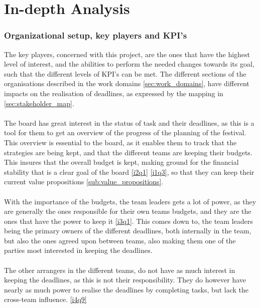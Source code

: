 \part{In-depth Analysis}
\label{prt:in_depth_analysis}
\section{Organizational setup, key players and KPI's}
The key players, concerned with this project, are the ones that have the highest level of interest, and the abilities to perform the needed changes towards its goal, such that the different levels of KPI's can be met. The different sections of the organisations described in the work domains \ref{sec:work_domains}, have different impacts on the realisation of deadlines, as expressed by the mapping in \ref{sec:stakeholder_map}.
\\ \\
The board has great interest in the status of task and their deadlines, as this is a tool for them to get an overview of the progress of the planning of the festival. This overview is essential to the board, as it enables them to track that the strategies are being kept, and that the different teams are keeping their budgets. This insures that the overall budget is kept, making ground for the financial stability that is a clear goal of the board \ref{i2q1} \ref{i1q3}, so that they can keep their current value propositions \ref{sub:value_propositions}.
\\ \\
With the importance of the budgets, the team leaders gets a lot of power, as they are generally the ones responsible for their own teams budgets, and they are the ones that have the power to keep it \ref{i3q1}. This comes down to, the team leaders being the primary owners of the different deadlines, both internally in the team, but also the ones agreed upon between teams, also making them one of the parties most interested in keeping the deadlines.
\\ \\
The other arrangers in the different teams, do not have as much interest in keeping the deadlines, as this is not their responsibility. They do however have nearly as much power to realise the deadlines by completing tasks, but lack the cross-team influence. \ref{i4q9}


